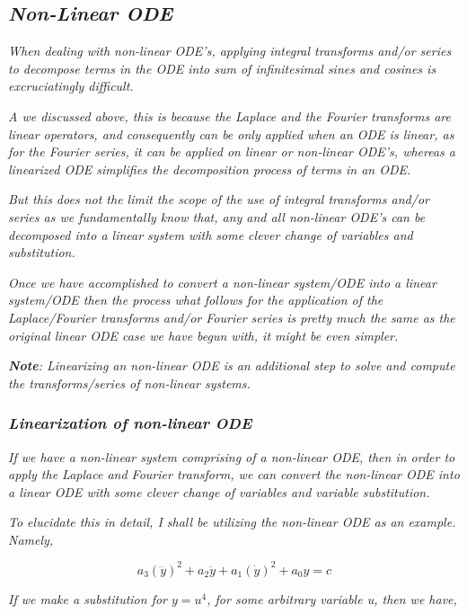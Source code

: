 

\subsection{\textit{Non-Linear ODE}}

	\textit{When dealing with non-linear ODE's, applying integral transforms and/or series to decompose terms in the ODE into sum of infinitesimal sines and cosines is excruciatingly difficult.}

	\textit{A we discussed above, this is because the Laplace and the Fourier transforms are linear operators, and consequently can be only applied when an ODE is linear, as for the Fourier series, it can be applied on linear or non-linear ODE's, whereas a linearized ODE simplifies the decomposition process of terms in an ODE.}

	\textit{But this does not the limit the scope of the use of integral transforms and/or series as we fundamentally know that, any and all non-linear ODE's can be decomposed into a linear system with some clever change of variables and substitution.}

	\textit{Once we have accomplished to convert a non-linear system/ODE into a linear system/ODE then the process what follows for the application of the Laplace/Fourier transforms and/or Fourier series is pretty much the same as the original linear ODE case we have begun with, it might be even simpler.}

	\textit{\textbf{Note}: Linearizing an non-linear ODE is an additional step to solve and compute the transforms/series of non-linear systems.}

	\subsubsection{\textit{Linearization of non-linear ODE}}
		
		\textit{If we have a non-linear system comprising of a non-linear ODE, then in order to apply the Laplace and Fourier transform, we can convert the non-linear ODE into a linear ODE with some clever change of variables and variable substitution.}		
		
		\textit{To elucidate this in detail, I shall be utilizing the non-linear ODE as an example. Namely,}		
		
			$$a_3\left(\dddot{y}\right)^2 + a_2\ddot{y} + a_1\left(\dot{y}\right)^2 + a_0y = c$$		
		
		\textit{If we make a substitution for $y = u^4$, for some arbitrary variable u, then we have,}		
		
